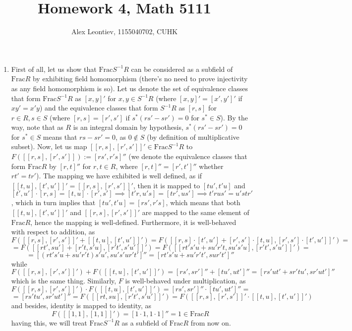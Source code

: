 \documentclass[8pt]{article} %
\title{Homework 4, Math 5111}
\author{Alex Leontiev, 1155040702, CUHK}
\begin{document}
\maketitle
\begin{enumerate}[label=\bfseries Problem \arabic*.]
	\newcommand{\Frac}{\mbox{Frac}}
	\item First of all, let us show that $\Frac S^{-1}R$ can be considered as a subfield of $\Frac R$ by exhibiting field homomorphism
		(there's no need to prove injectivity as any field homomorphism is so).
		Let us denote the set of equivalence classes that form $\Frac S^{-1}R$ as $[x,y]'$ for $x,y\in S^{-1}R$ (where $[x,y]'=[x',y']'$ if
		$xy'=x'y$) and the equivalence classes that form $S^{-1}R$ as $[r,s]$ for $r\in R,s\in S$ (where $[r,s]=[r',s']$ if $s^*(rs'-sr')=0$
		for $s^*\in S$). By the way, note that as $R$ is an integral domain by hypothesis, $s^*(rs'-sr')=0$ for $s^*\in S$ means that
		$rs-sr'=0$, as $0\notin S$ (by definition of multiplicative subset). Now, let us map $[[r,s],[r',s']]'\in\Frac S^{-1}R$ to $
		F([[r,s],[r',s']]):=[
		rs',r's]''$ (we denote the equivalence classes that form $\Frac R$ by $[r,t]''$ for $r,t\in R$, where $[r,t]''=[r',t']''$ whether
		$rt'=tr'$). The mapping we have exhibited is well defined, as if $[[t,u],[t',u']]'=[[r,s],[r',s']]'$, then it is
		mapped to $[tu',t'u]$ and
		\[[t',u']\cdot[r,s]=[t,u]\cdot[r',s']\implies [t'r,u's]=[tr',us']\implies t'rus'=u'str'\], which in turn implies that $[tu',t'u]=
		[rs',r's]$, which means that both $[[t,u],[t',u']]'$ and $[[r,s],[r',s']]'$ are mapped to the same element of $\Frac R$, hence
		the mapping is well-defined. Furthermore, it is well-behaved with respect to addition, as \[F([[r,s],[r',s']]'+[[t,u],[t',u']]')=
		F([[r,s]\cdot[t',u']+[r',s']\cdot[t,u],[r',s']\cdot[t',u']]')=\]
		\[=F([[rt',su']+[r't,s'u],[r't',s'u']]')=F([[rt's'u+su'r't,su's'u],[r't',s'u']]')=\]\[=[(rt's'u+su'r't)s'u',su's'ur't']''=
		[rt's'u+su'r't',sur't']''\]
		while \[F([[r,s],[r',s']]')+F([[t,u],[t',u']]')=[rs',sr']''+[tu',ut']''=[rs'ut'+sr'tu',sr'ut']''\]
		which is the same thing. Similarly, $F$ is well-behaved under multiplication, as
		\[F([[r,s],[r',s']]')\cdot F([[t,u],[t',u']]')=[rs',sr']''\cdot[tu',ut']''=\]
		\[=[rs'tu',sr'ut']''=F([[rt,su],[r't',s'u']]')=F([[r,s],[r',s']]'\cdot[[t,u],[t',u']]')\]
		and besides, identity is mapped to identity, as
		\[F([[1,1],[1,1]]')=[1\cdot1,1\cdot1]''=1\in\Frac R\]
		having this, we will treat $\Frac S^{-1}R$ as a subfield of $\Frac R$ from now on.
\end{enumerate}
\end{document}
